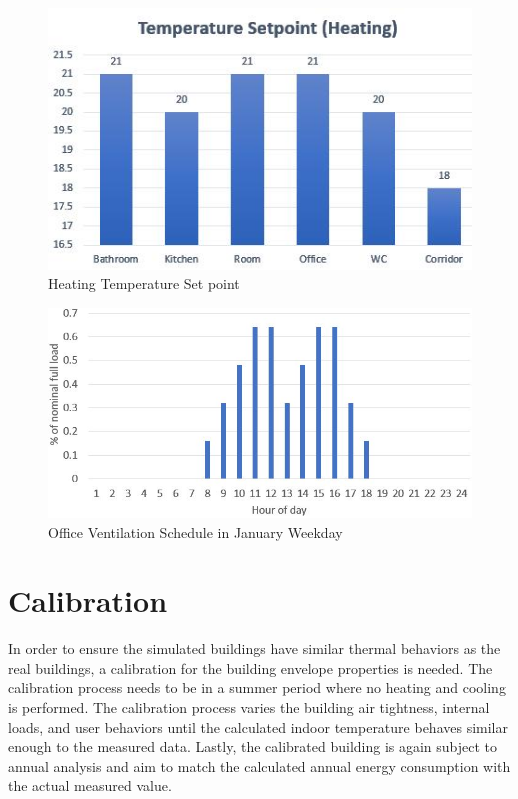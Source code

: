 \documentclass[a4paper, oneside]{discothesis}
\begin{document}
		\begin{figure}[H]
		\centering
		\includegraphics[scale=1.1]{TempSetpoint.jpg}
		\caption{Heating Temperature Set point}
		\label{fig:HeatingSP}
		\end{figure}
		


		\begin{figure}[h!]
		\centering
		\includegraphics[scale=0.8]{figures/JanOffice_Vent.jpg}
		\caption{Office Ventilation Schedule in January Weekday}
		\label{fig:JanOffice_Vent}
		\end{figure}
		
	\section{Calibration}
		In order to ensure the simulated buildings have similar thermal behaviors as the real buildings, a calibration for the building envelope properties is needed. The calibration process needs to be in a summer period where no heating and cooling is performed. The calibration process varies the building air tightness, internal loads, and user behaviors until the calculated indoor temperature behaves similar enough to the measured data. Lastly, the calibrated building is again subject to annual analysis and aim to match the calculated annual energy consumption with the actual measured value.\\
		
\end{document}
